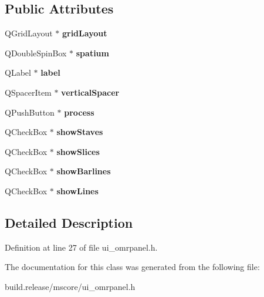 \subsection*{Public Attributes}
\begin{DoxyCompactItemize}
\item 
\mbox{\label{class_ui___omr_panel_ae912e3405940803d7d92ede58a7378a5}} 
Q\+Grid\+Layout $\ast$ {\bfseries grid\+Layout}
\item 
\mbox{\label{class_ui___omr_panel_a30635d577da197e733c86364bdacf25b}} 
Q\+Double\+Spin\+Box $\ast$ {\bfseries spatium}
\item 
\mbox{\label{class_ui___omr_panel_a75fa54b661d5112176611c9b08c79aaf}} 
Q\+Label $\ast$ {\bfseries label}
\item 
\mbox{\label{class_ui___omr_panel_a5f641cdbcda49125063280b7088b8247}} 
Q\+Spacer\+Item $\ast$ {\bfseries vertical\+Spacer}
\item 
\mbox{\label{class_ui___omr_panel_ae21180252de61f0960766333338faf34}} 
Q\+Push\+Button $\ast$ {\bfseries process}
\item 
\mbox{\label{class_ui___omr_panel_a45f0c1c0945adbc93777440f2fee7199}} 
Q\+Check\+Box $\ast$ {\bfseries show\+Staves}
\item 
\mbox{\label{class_ui___omr_panel_ad382ae38087b8c2dfd83871322086744}} 
Q\+Check\+Box $\ast$ {\bfseries show\+Slices}
\item 
\mbox{\label{class_ui___omr_panel_a201853eb6f0c25cc2ccdb33243d1bfc2}} 
Q\+Check\+Box $\ast$ {\bfseries show\+Barlines}
\item 
\mbox{\label{class_ui___omr_panel_ae148d636686a9526eb7e5e5e623887fa}} 
Q\+Check\+Box $\ast$ {\bfseries show\+Lines}
\end{DoxyCompactItemize}


\subsection{Detailed Description}


Definition at line 27 of file ui\+\_\+omrpanel.\+h.



The documentation for this class was generated from the following file\+:\begin{DoxyCompactItemize}
\item 
build.\+release/mscore/ui\+\_\+omrpanel.\+h\end{DoxyCompactItemize}
